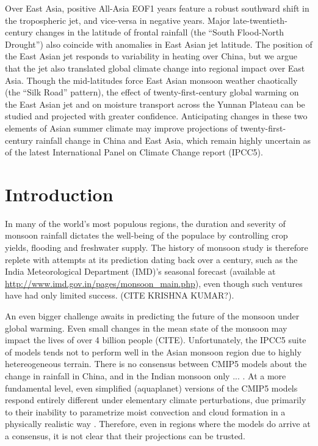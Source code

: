 Over East Asia, positive All-Asia EOF1 years feature a robust southward shift in the tropospheric jet, and vice-versa in negative years. Major late-twentieth-century changes in the latitude of frontal rainfall (the ``South Flood-North Drought'') also coincide with anomalies in East Asian jet latitude. The position of the East Asian jet responds to variability in heating over China, but we argue that the jet also translated global climate change into regional impact over East Asia. Though the mid-latitudes force East Asian monsoon weather chaotically (the ``Silk Road'' pattern), the effect of twenty-first-century global warming on the East Asian jet and on moisture transport across the Yunnan Plateau can be studied and projected with greater confidence. Anticipating changes in these two elements of Asian summer climate may improve projections of twenty-first-century rainfall change in China and East Asia, which remain highly uncertain as of the latest International Panel on Climate Change report (IPCC5).

\section{Introduction}

	In many of the world's most populous regions, the duration and severity of monsoon rainfall dictates the well-being of the populace by controlling crop yields, flooding and freshwater supply. The history of monsoon study is therefore replete with attempts at its prediction dating back over a century, such as the India Meteorological Department (IMD)'s seasonal forecast (available at \url{http://www.imd.gov.in/pages/monsoon_main.php}), even though such ventures have had only limited success. (CITE KRISHNA KUMAR?). 
	
	An even bigger challenge awaits in predicting the future of the monsoon under global warming. Even small changes in the mean state of the monsoon may impact the lives of over 4 billion people (CITE). Unfortunately, the IPCC5 suite of models tends not to perform well in the Asian monsoon region due to highly hetereogeneous terrain. There is no consensus between CMIP5 models about the change in rainfall in China, and in the Indian monsoon only ... .  At a more fundamental level, even simplified (aquaplanet) versions of the CMIP5 models respond entirely different under elementary climate perturbations, due primarily to their inability to parametrize moist convection and cloud formation in a physically realistic way \citep{Stevens2013}. Therefore, even in regions where the models do arrive at a consensus, it is not clear that their projections can be trusted.
	
